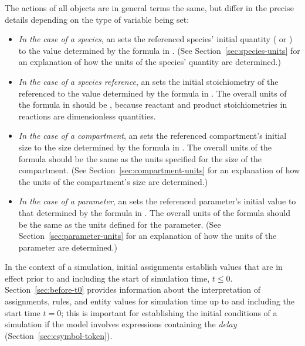 The actions of all \InitialAssignment objects are in general terms
the same, but differ in the precise details depending on the type
of variable being set:
\begin{itemize}

\item \emph{In the case of a species}, an \InitialAssignment sets
  the referenced species' initial quantity
  ( or ) to
  the value determined by the formula in .  (See
  Section~\ref{sec:species-units} for an explanation of how the
  units of the species' quantity are determined.)

\item \emph{In the case of a species reference}, an
  \InitialAssignment sets the initial stoichiometry of the
  referenced \SpeciesReference to the value determined by the
  formula in .  The overall units of the formula in
   should be , because reactant
  and product stoichiometries in reactions are dimensionless
  quantities.

\item \emph{In the case of a compartment}, an \InitialAssignment
  sets the referenced compartment's initial size to the size
  determined by the formula in .  The overall units of
  the formula should be the same as the units specified for the size of the
  compartment.  (See Section~\ref{sec:compartment-units} for an
  explanation of how the units of the compartment's size are
  determined.)

\item \emph{In the case of a parameter}, an \InitialAssignment
  sets the referenced parameter's initial value to that determined
  by the formula in .  The overall units of the
  formula should be the same as the units defined for the parameter.  (See
  Section~\ref{sec:parameter-units} for an explanation of how the
  units of the parameter are determined.)

\end{itemize}

In the context of a simulation, initial assignments establish
values that are in effect prior to and including the start of
simulation time, \ie $t \leq 0$.  Section~\ref{sec:before-t0}
provides information about the interpretation of assignments,
rules, and entity values for simulation time up to and including
the start time $t = 0$; this is important for establishing the
initial conditions of a simulation if the model involves
expressions containing the \emph{delay} 
(Section~\ref{sec:csymbol-token}).

